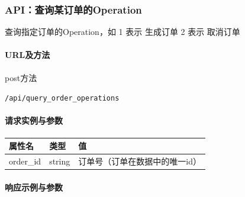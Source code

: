 \documentclass[]{article}
\let\oldparagraph\paragraph
\renewcommand{\paragraph}[1]{\oldparagraph{#1}\mbox{}}
\begin{document}
\hypertarget{apiux67e5ux8be2ux67d0ux8ba2ux5355ux7684operation}{%
\subsubsection{API：查询某订单的Operation}\label{apiux67e5ux8be2ux67d0ux8ba2ux5355ux7684operation}}

查询指定订单的Operation，如 1 表示 生成订单 2 表示 取消订单

\hypertarget{urlux53caux65b9ux6cd5-1}{%
\paragraph{URL及方法}\label{urlux53caux65b9ux6cd5-1}}

post方法

\texttt{/api/query\_order\_operations}

\hypertarget{ux8bf7ux6c42ux5b9eux4f8bux4e0eux53c2ux6570-3}{%
\paragraph{请求实例与参数}\label{ux8bf7ux6c42ux5b9eux4f8bux4e0eux53c2ux6570-3}}

\begin{longtable}[]{@{}lll@{}}
\toprule
属性名 & 类型 & 值\tabularnewline
\midrule
\endhead
order\_id & string & 订单号（订单在数据中的唯一id）\tabularnewline
\bottomrule
\end{longtable}

\hypertarget{ux54cdux5e94ux793aux4f8bux4e0eux53c2ux6570-13}{%
\paragraph{响应示例与参数}\label{ux54cdux5e94ux793aux4f8bux4e0eux53c2ux6570-13}}

\begin{Shaded}
\begin{Highlighting}[]
\FunctionTok{\{}
    \FunctionTok{:}\OtherTok{[}
        \FunctionTok{\{}
            \FunctionTok{:}\FunctionTok{,}
            \FunctionTok{:}\FunctionTok{,}
            \FunctionTok{:}
        \FunctionTok{\}}\OtherTok{,}
        \FunctionTok{\{}
        \FunctionTok{\}}
 
    \OtherTok{]}
\FunctionTok{\}}
\end{Highlighting}
\end{Shaded}
\end{document}
